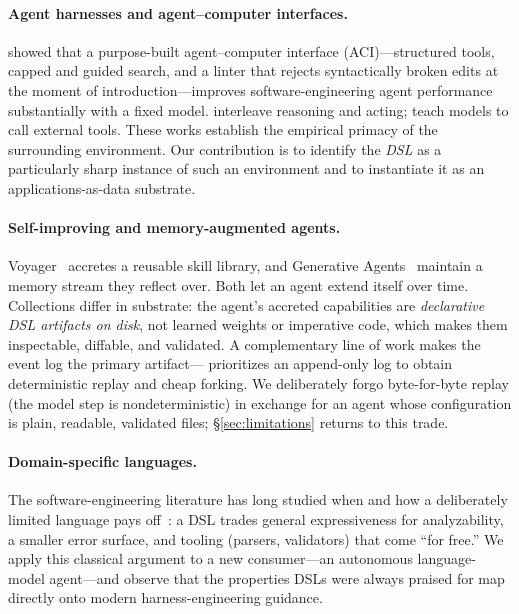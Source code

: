 \documentclass[11pt]{article}
\begin{document}
\paragraph{Agent harnesses and agent--computer interfaces.}
\citet{yang2024sweagent} showed that a purpose-built agent--computer interface
(ACI)---structured tools, capped and guided search, and a linter that rejects
syntactically broken edits at the moment of introduction---improves software-engineering
agent performance substantially with a fixed model. \citet{yao2023react}
interleave reasoning and acting; \citet{schick2023toolformer} teach models to call
external tools. These works establish the empirical primacy of the surrounding
environment. Our contribution is to identify the \emph{DSL} as a particularly
sharp instance of such an environment and to instantiate it as an
applications-as-data substrate.

\paragraph{Self-improving and memory-augmented agents.}
Voyager~\citep{wang2023voyager} accretes a reusable skill library, and Generative
Agents~\citep{park2023generative} maintain a memory stream they reflect over. Both
let an agent extend itself over time. Collections differ in substrate: the agent's
accreted capabilities are \emph{declarative DSL artifacts on disk}, not learned
weights or imperative code, which makes them inspectable, diffable, and validated.
A complementary line of work makes the event log the primary
artifact---\citet{ynakajima2026log} prioritizes an append-only log to obtain
deterministic replay and cheap forking. We deliberately forgo byte-for-byte replay
(the model step is nondeterministic) in exchange for an agent whose configuration
is plain, readable, validated files; \S\ref{sec:limitations} returns to this
trade.

\paragraph{Domain-specific languages.}
The software-engineering literature has long studied when and how a deliberately
limited language pays off~\citep{mernik2005dsl,fowler2010dsl}: a DSL trades general
expressiveness for analyzability, a smaller error surface, and tooling (parsers,
validators) that come ``for free.'' We apply this classical argument to a new
consumer---an autonomous language-model agent---and observe that the properties
DSLs were always praised for map directly onto modern harness-engineering
guidance.
\end{document}

